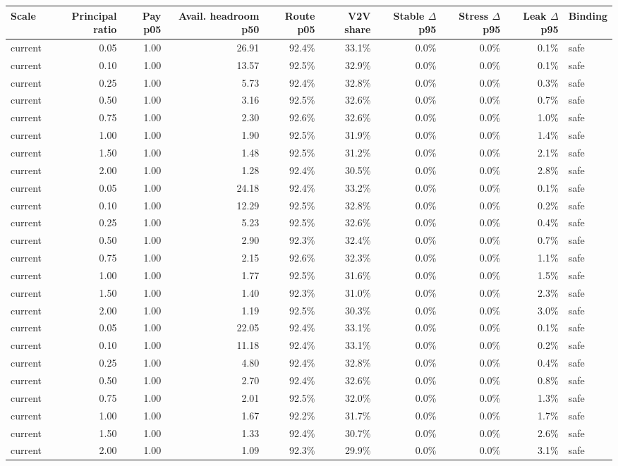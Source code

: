 \begingroup
\small
\setlength{\tabcolsep}{3pt}
\begin{tabular}{lrrrrrrrrl}
\toprule
Scale & Principal ratio & Pay p05 & Avail. headroom p50 & Route p05 & V2V share & Stable $\Delta$ p95 & Stress $\Delta$ p95 & Leak $\Delta$ p95 & Binding \\
\midrule
current & 0.05 & 1.00 & 26.91 & 92.4\% & 33.1\% & 0.0\% & 0.0\% & 0.1\% & safe \\
current & 0.10 & 1.00 & 13.57 & 92.5\% & 32.9\% & 0.0\% & 0.0\% & 0.1\% & safe \\
current & 0.25 & 1.00 & 5.73 & 92.4\% & 32.8\% & 0.0\% & 0.0\% & 0.3\% & safe \\
current & 0.50 & 1.00 & 3.16 & 92.5\% & 32.6\% & 0.0\% & 0.0\% & 0.7\% & safe \\
current & 0.75 & 1.00 & 2.30 & 92.6\% & 32.6\% & 0.0\% & 0.0\% & 1.0\% & safe \\
current & 1.00 & 1.00 & 1.90 & 92.5\% & 31.9\% & 0.0\% & 0.0\% & 1.4\% & safe \\
current & 1.50 & 1.00 & 1.48 & 92.5\% & 31.2\% & 0.0\% & 0.0\% & 2.1\% & safe \\
current & 2.00 & 1.00 & 1.28 & 92.4\% & 30.5\% & 0.0\% & 0.0\% & 2.8\% & safe \\
current & 0.05 & 1.00 & 24.18 & 92.4\% & 33.2\% & 0.0\% & 0.0\% & 0.1\% & safe \\
current & 0.10 & 1.00 & 12.29 & 92.5\% & 32.8\% & 0.0\% & 0.0\% & 0.2\% & safe \\
current & 0.25 & 1.00 & 5.23 & 92.5\% & 32.6\% & 0.0\% & 0.0\% & 0.4\% & safe \\
current & 0.50 & 1.00 & 2.90 & 92.3\% & 32.4\% & 0.0\% & 0.0\% & 0.7\% & safe \\
current & 0.75 & 1.00 & 2.15 & 92.6\% & 32.3\% & 0.0\% & 0.0\% & 1.1\% & safe \\
current & 1.00 & 1.00 & 1.77 & 92.5\% & 31.6\% & 0.0\% & 0.0\% & 1.5\% & safe \\
current & 1.50 & 1.00 & 1.40 & 92.3\% & 31.0\% & 0.0\% & 0.0\% & 2.3\% & safe \\
current & 2.00 & 1.00 & 1.19 & 92.5\% & 30.3\% & 0.0\% & 0.0\% & 3.0\% & safe \\
current & 0.05 & 1.00 & 22.05 & 92.4\% & 33.1\% & 0.0\% & 0.0\% & 0.1\% & safe \\
current & 0.10 & 1.00 & 11.18 & 92.4\% & 33.1\% & 0.0\% & 0.0\% & 0.2\% & safe \\
current & 0.25 & 1.00 & 4.80 & 92.4\% & 32.8\% & 0.0\% & 0.0\% & 0.4\% & safe \\
current & 0.50 & 1.00 & 2.70 & 92.4\% & 32.6\% & 0.0\% & 0.0\% & 0.8\% & safe \\
current & 0.75 & 1.00 & 2.01 & 92.5\% & 32.0\% & 0.0\% & 0.0\% & 1.3\% & safe \\
current & 1.00 & 1.00 & 1.67 & 92.2\% & 31.7\% & 0.0\% & 0.0\% & 1.7\% & safe \\
current & 1.50 & 1.00 & 1.33 & 92.4\% & 30.7\% & 0.0\% & 0.0\% & 2.6\% & safe \\
current & 2.00 & 1.00 & 1.09 & 92.3\% & 29.9\% & 0.0\% & 0.0\% & 3.1\% & safe \\
\bottomrule
\end{tabular}
\endgroup
